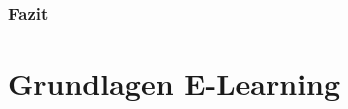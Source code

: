 \documentclass[a4paper, 12pt, twoside, BCOR=20mm, DIV=calc, abstracton, parskip=half*, toc=bibliography, toc=listof, headsepline, footsepline, headings=small, numbers=enddot]{scrreprt}
\begin{document}
\subsection{Fazit}
%


\chapter{Grundlagen E-Learning}
\end{document}
